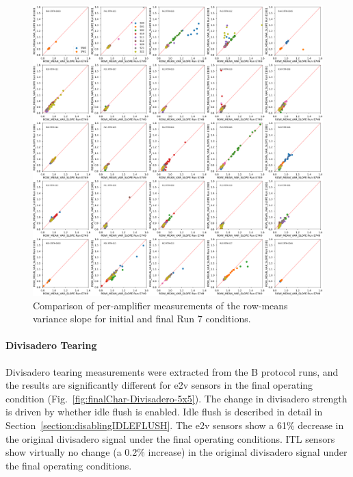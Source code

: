 \begin{figure}[ht]
    \centering
    \includegraphics[width=0.7\linewidth]{figures/finalCharacterization/E749_E1881_ROW_MEAN_VAR_SLOPE.png}
    \caption{Comparison of per-amplifier measurements of the row-means variance slope  for initial and final Run 7 conditions.}
    \label{fig:finalChar-RowMeanVarSlope-5x5}
\end{figure}

\clearpage
\paragraph{Divisadero Tearing}\label{final-divisadero-tearing}

Divisadero tearing measurements were extracted from the B protocol runs, and the results are significantly different for e2v sensors in the final operating condition (Fig.~\ref{fig:finalChar-Divisadero-5x5}). The change in divisadero strength is driven by whether idle flush is enabled.  Idle flush is described in detail in Section~\ref{section:disablingIDLEFLUSH}. The e2v sensors show a 61\% decrease in the original divisadero signal under the final operating conditions. ITL sensors show virtually no change (a 0.2\% increase) in the original divisadero signal under the final operating conditions.

